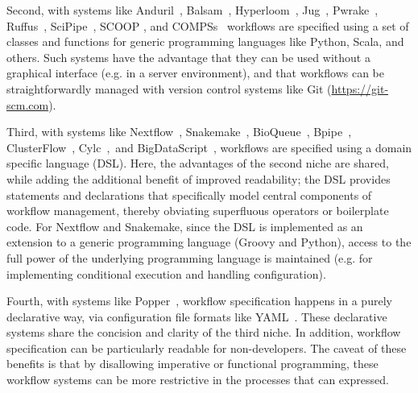 \documentclass[parskip=half, DIV=18]{scrartcl}
\let\plainurl\url
\renewcommand{\url}[1]{\protect\plainurl{#1}}
\begin{document}
Second, with systems like Anduril~\parencite{Cervera2019}, Balsam~\parencite{papka2018}, Hyperloom~\parencite{cima2018hyperloom}, Jug~\parencite{Coelho_2017}, Pwrake~\parencite{Tanaka_2010}, Ruffus~\parencite{Goodstadt2010}, SciPipe~\parencite{Lampa2019}, SCOOP \parencite{SCOOP_XSEDE2014}, and COMPSs~\parencite{Lordan_2013} workflows are specified using a set of classes and functions for generic programming languages like Python, Scala, and others.
Such systems have the advantage that they can be used without a graphical interface (e.g. in a server environment), and that workflows can be straightforwardly managed with version control systems like Git (\url{https://git-scm.com}).

Third, with systems like Nextflow~\parencite{Di_Tommaso_2017}, Snakemake~\parencite{Koester2012}, BioQueue~\parencite{Yao2017}, Bpipe~\parencite{Sadedin2012}, ClusterFlow~\parencite{Ewels2016}, Cylc~\parencite{J_Oliver_2018},~and BigDataScript~\parencite{Cingolani_2014}, workflows are specified using a domain specific language (DSL).
Here, the advantages of the second niche are shared, while adding the additional benefit of improved readability; the DSL provides statements and declarations that specifically model central components of workflow management, thereby obviating superfluous operators or boilerplate code.
For Nextflow and Snakemake, since the DSL is implemented as an extension to a generic programming language (Groovy and Python), access to the full power of the underlying programming language is maintained (e.g. for implementing conditional execution and handling configuration).

Fourth, with systems like Popper~\parencite{Jimenez_2017}, workflow specification happens in a purely declarative way, via configuration file formats like YAML~\parencite{Evans2009-vp}.
These declarative systems share the concision and clarity of the third niche.
In addition, workflow specification can be particularly readable for non-developers.
The caveat of these benefits is that by disallowing imperative or functional programming, these workflow systems can be more restrictive in the processes that can expressed.
\end{document}
